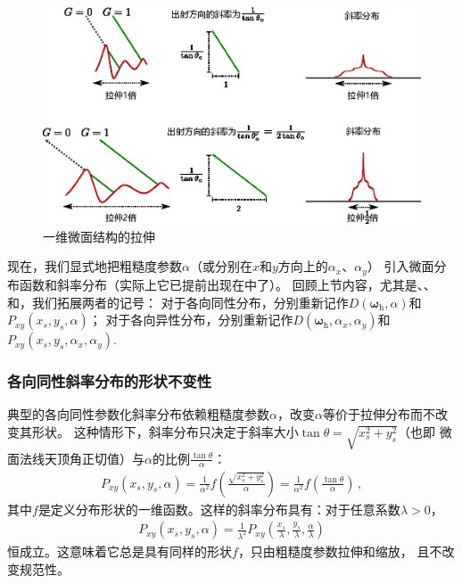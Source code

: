 \begin{figure}[htbp]
    \centering
    \includegraphics[width=\linewidth]{Pictures/chap08/Stretch1D.eps}
    \caption{一维微面结构的拉伸}
    \label{fig:08ex01-Stretch1D}
\end{figure}

现在，我们显式地把粗糙度参数$\alpha$（或分别在$x$和$y$方向上的$\alpha_x$、$\alpha_y$）
引入微面分布函数和斜率分布（实际上它已提前出现在中了）。
回顾上节内容，尤其是、、
和，我们拓展两者的记号：
对于各向同性分布，分别重新记作$D({\bm\omega}_{\mathrm{h}},\alpha)$和$P_{xy}(x_s,y_s,\alpha)$；
对于各向异性分布，分别重新记作$D({\bm\omega}_{\mathrm{h}},\alpha_x,\alpha_y)$和$P_{xy}(x_s,y_s,\alpha_x,\alpha_y)$.

\subsubsection*{各向同性斜率分布的形状不变性}
典型的各向同性参数化斜率分布依赖粗糙度参数$\alpha$，改变$\alpha$等价于拉伸分布而不改变其形状。
这种情形下，斜率分布只决定于斜率大小$\displaystyle\tan\theta=\sqrt{x_s^2+y_s^2}$（也即
微面法线天顶角正切值）与$\alpha$的比例$\displaystyle\frac{\tan\theta}{\alpha}$：
\begin{align}
    P_{xy}(x_s,y_s,\alpha)=\frac{1}{\alpha^2}f\left(\frac{\sqrt{x_s^2+y_s^2}}{\alpha}\right)=\frac{1}{\alpha^2}f\left(\frac{\tan\theta}{\alpha}\right)\, ,
\end{align}
其中$f$是定义分布形状的一维函数。这样的斜率分布具有：对于任意系数$\lambda>0$，
\begin{align}
    P_{xy}(x_s,y_s,\alpha)=\frac{1}{\lambda^2}P_{xy}(\frac{x_s}{\lambda},\frac{y_s}{\lambda},\frac{\alpha}{\lambda})
\end{align}
恒成立。这意味着它总是具有同样的形状$f$，只由粗糙度参数拉伸和缩放，
且不改变规范性。

